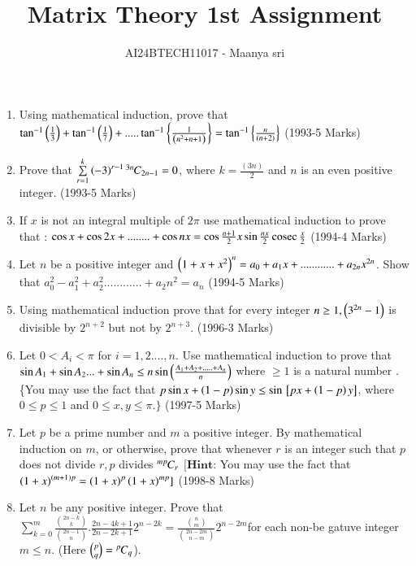 \documentclass[journal,12pt,onecolumn]{IEEEtran}
\theoremstyle{remark}
\begin{document}

\vspace{3cm}

\title{Matrix Theory 1st Assignment}
\author{AI24BTECH11017 - Maanya sri}
\maketitle
\newpage
\bigskip

\renewcommand{\thefigure}{\theenumi}
\renewcommand{\thetable}{\theenumi}
\begin{enumerate}[start=16] 
\item Using mathematical induction, prove that $\tan^{-1}\left(\frac{1}{3}\right)  +  \tan^{-1}\left(\frac{1}{7}\right) + .....\tan^{-1}\left\{\frac{1}{\left(n^2 + n + 1\right)}\right\} = \tan^{-1}\left\{\frac{n}{\left(n+2\right)}\right\}$ 
\hfill(1993-5 Marks) 
\item Prove that $\sum\limits^{k}_{r=1} \left(-3\right)^{r-1} {{}^{3n}\mkern-1muC_{2n-1}} = 0$, where $k=\frac{(3n)}{2}$ and $n$ is an even positive integer.
\hfill(1993-5 Marks)
\item If $x$ is not an integral multiple of $2\pi$ use mathematical induction to prove that : 
$\cos{x} + \cos{2x} + ........ + \cos{nx} = \cos{\frac{n+1}{2}x}\sin{\frac{nx}{2}}\,\text{cosec}\,{\frac{x}{2}}$
\hfill(1994-4 Marks)
\item 
Let $n$ be a positive integer and $\left(1+x+x^2\right)^n = a_0 + a_1 x + ............+ a_{2n} x^{2n}$. Show that $a_0^2 - a_1^2 + a_2^2 ............ + a_2n^2 = a_n$
\hfill(1994-5 Marks)
\item 
Using mathematical induction prove that for every integer $n \geq 1 , \left(3^{2n} -1\right)$ is divisible by $2^{n+2}$ but not by $2^{n+3}$.
\hfill(1996-3 Marks)
\item 
Let $0<A_i<\pi$ for $i= 1,2....,n$. Use mathematical induction to prove that $\sin{A_1} + \sin{A_2}... + \sin{A_n} \leq  n \sin{\ensuremath{\left(\frac{A_1 + A_2 +.....+ A_n}{n}\right)}}$ where $\geq 1$ is a natural number .\{You may use the fact that $p \sin{x} + \left(1-p\right)\sin{y}\leq \sin{\ensuremath{{}\left[px + \left(1-p\right)y\right]}}$, where $0 \leq p \leq 1$ and $0 \leq x,y \leq \pi.\}$
\hfill(1997-5 Marks)
\item 
Let $p$ be a prime number and $m$ a positive integer. By mathematical induction on $m$, or otherwise, prove that whenever $r$ is an integer such that $p$ does not divide $r , p$ divides ${{}^{mp}\mkern-1muC_{r}}$
$[\textbf{Hint:}$ You may use the fact that $\left(1+x\right)^{\left(m+1\right)p} = \left(1+x\right)^p\left(1+x\right)^{mp}]$
\hfill(1998-8 Marks)
\item 
Let $n$ be any positive integer. Prove that $\sum\limits^{m}_{k=0}\frac{\binom{2n-k}{k}}{\binom{2n-1}{n}}.\frac{2n-4k+1}{2n-2k+1}2^{n-2k}= \frac{\binom{n}{m}}{\binom{2n-2m}{n-m}} 2^{n-2m}$for each non-be gatuve integer $m\leq n$. (Here $\binom{p}{q} = {{}^{p}\mkern-1muC_{q}}$).

\end{enumerate}
\end{document}
